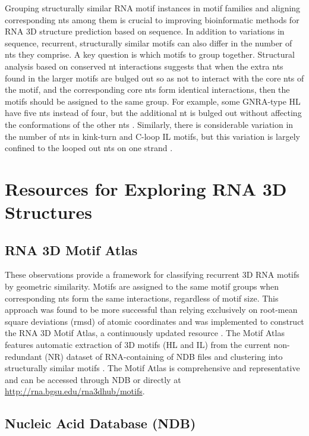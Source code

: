 Grouping structurally similar RNA motif instances in motif families and aligning
corresponding nts among them is crucial to improving bioinformatic methods for
RNA 3D structure prediction based on sequence. In addition to variations in
sequence, recurrent, structurally similar motifs can also differ in the number
of nts they comprise. A key question is which motifs to group together.
Structural analysis based on conserved nt interactions suggests that when the
extra nts found in the larger motifs are bulged out so as not to interact with
the core nts of the motif, and the corresponding core nts form identical
interactions, then the motifs should be assigned to the same group. For example,
some GNRA-type HL have five nts instead of four, but the additional nt is bulged
out without affecting the conformations of the other nts \cite{Nasalean2009b}.
Similarly, there is considerable variation in the number of nts in kink-turn and
C-loop IL motifs, but this variation is largely confined to the looped out nts
on one strand \cite{Lescoute2005}.

\section{Resources for Exploring RNA 3D Structures}

\subsection{RNA 3D Motif Atlas}

These observations provide a framework for classifying recurrent 3D RNA motifs
by geometric similarity. Motifs are assigned to the same motif groups when
corresponding nts form the same interactions, regardless of motif size. This
approach was found to be more successful than relying exclusively on root-mean
square deviations (rmsd) of atomic coordinates and was implemented to construct
the RNA 3D Motif Atlas, a continuously updated resource \cite{Petrov2013}. The
Motif Atlas features automatic extraction of 3D motifs (HL and IL) from the
current non-redundant (NR) dataset of RNA-containing of NDB files and clustering
into structurally similar motifs \cite{Petrov2013}. The Motif Atlas is
comprehensive and representative and can be accessed through NDB or directly at
\url{http://rna.bgsu.edu/rna3dhub/motifs}.

\subsection{Nucleic Acid Database (NDB)}

